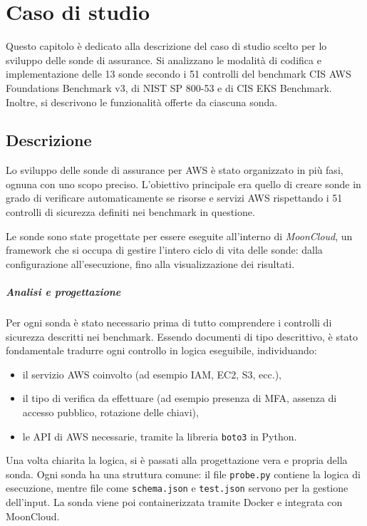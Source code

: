 \chapter{Caso di studio}
\label{cap:caso_studio}

Questo capitolo è dedicato alla descrizione del caso di studio scelto per lo sviluppo delle sonde di assurance. Si analizzano le modalità di codifica e implementazione delle 13 sonde secondo i 51 controlli del benchmark CIS AWS Foundations Benchmark v3, di NIST SP 800-53 e di CIS EKS Benchmark. Inoltre, si descrivono le funzionalità offerte da ciascuna sonda.

\section{Descrizione}

Lo sviluppo delle sonde di assurance per AWS è stato organizzato in più fasi, ognuna con uno scopo preciso. L'obiettivo principale era quello di creare sonde in grado di verificare automaticamente se risorse e servizi AWS rispettando i 51 controlli di sicurezza definiti nei benchmark in questione. 

Le sonde sono state progettate per essere eseguite all'interno di \textit{MoonCloud}, un framework che si occupa di gestire l'intero ciclo di vita delle sonde: dalla configurazione all'esecuzione, fino alla visualizzazione dei risultati.

\paragraph{Analisi e progettazione} Per ogni sonda è stato necessario prima di tutto comprendere i controlli di sicurezza descritti nei benchmark. Essendo documenti di tipo descrittivo, è stato fondamentale tradurre ogni controllo in logica eseguibile, individuando:
\begin{itemize}
    \item il servizio AWS coinvolto (ad esempio IAM, EC2, S3, ecc.),
    \item il tipo di verifica da effettuare (ad esempio presenza di MFA, assenza di accesso pubblico, rotazione delle chiavi),
    \item le API di AWS necessarie, tramite la libreria \texttt{boto3} in Python.
\end{itemize}

Una volta chiarita la logica, si è passati alla progettazione vera e propria della sonda. Ogni sonda ha una struttura comune: il file \texttt{probe.py} contiene la logica di esecuzione, mentre file come \texttt{schema.json} e \texttt{test.json} servono per la gestione dell'input. La sonda viene poi containerizzata tramite Docker e integrata con MoonCloud.

